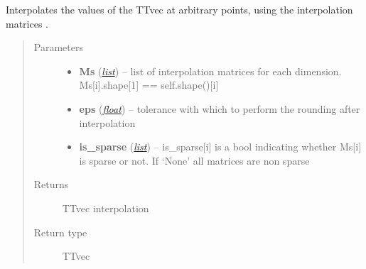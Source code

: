 \documentclass[a4paper,10pt,english]{sphinxmanual}
\begin{document}
\begin{fulllineitems}
\begin{fulllineitems}
\begin{quote}
\begin{description}
\end{description}\end{quote}

\end{fulllineitems}


\begin{fulllineitems}
\label{api-ttvec:TensorToolbox.core.TTvec.interpolate}
Interpolates the values of the TTvec at arbitrary points, using the interpolation matrices .
\begin{quote}\begin{description}
\item[{Parameters}] \leavevmode\begin{itemize}
\item {} 
\textbf{Ms} (\href{http://docs.python.org/library/functions.html\#list}{\emph{list}}) -- list of interpolation matrices for each dimension. Ms{[}i{]}.shape{[}1{]} == self.shape(){[}i{]}

\item {} 
\textbf{eps} (\href{http://docs.python.org/library/functions.html\#float}{\emph{float}}) -- tolerance with which to perform the rounding after interpolation

\item {} 
\textbf{is\_sparse} (\href{http://docs.python.org/library/functions.html\#list}{\emph{list}}) -- is\_sparse{[}i{]} is a bool indicating whether Ms{[}i{]} is sparse or not. If `None' all matrices are non sparse

\end{itemize}

\item[{Returns}] \leavevmode
TTvec interpolation

\item[{Return type}] \leavevmode
TTvec

\end{description}\end{quote}


\end{fulllineitems}
\end{fulllineitems}
\end{document}
